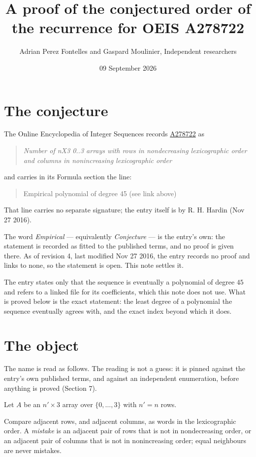 \documentclass[11pt]{article}
\title{A proof of the conjectured order of the recurrence for OEIS A278722}
\author{Adrian Perez Fontelles and Gaspard Moulinier, Independent researchers}
\date{09 September 2026}
\theoremstyle{definition}
\begin{document}
\maketitle
\section{The conjecture}

The Online Encyclopedia of Integer Sequences records \href{https://oeis.org/A278722}{A278722} as

\begin{quote}\itshape Number of nX3 0..3 arrays with rows in nondecreasing lexicographic order and columns in nonincreasing lexicographic order\end{quote}

and carries in its Formula section the line:

\begin{quote}\ttfamily Empirical polynomial of degree 45 (see link above)\end{quote}

That line carries no separate signature; the entry itself is by R. H. Hardin (Nov 27 2016).

The word {\itshape Empirical} --- equivalently {\itshape Conjecture} --- is the entry's own: the statement is recorded as fitted to the published terms, and no proof is given there. As of revision 4, last modified Nov 27 2016, the entry records no proof and links to none, so the statement is open. This note settles it.

The entry states only that the sequence is eventually a polynomial of degree $45$ and refers to a linked file for its coefficients, which this note does not use. What is proved below is the exact statement: the least degree of a polynomial the sequence eventually agrees with, and the exact index beyond which it does.

\section{The object}

The name is read as follows. The reading is not a guess: it is pinned against the entry's own published terms, and against an independent enumeration, before anything is proved (Section 7).

Let $A$ be an $n' \times 3$ array over $\{0,\dots,3\}$ with $n' = n$ rows.

Compare adjacent rows, and adjacent columns, as words in the lexicographic order. A {\itshape mistake} is an adjacent pair of rows that is not in nondecreasing order, or an adjacent pair of columns that is not in nonincreasing order; equal neighbours are never mistakes.
\end{document}
